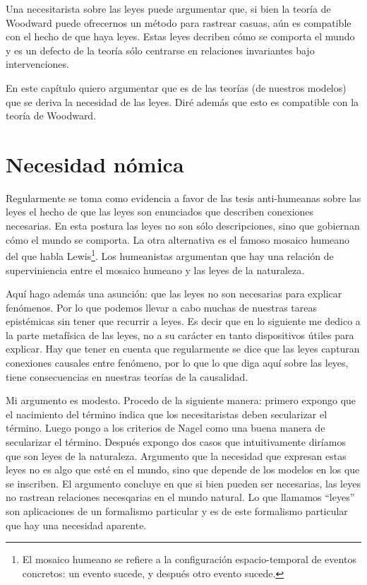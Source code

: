 Una necesitarista sobre las leyes puede argumentar que, si bien la teoría de Woodward puede ofrecernos un método para rastrear casuas, aún es compatible con el hecho de que haya leyes. Estas leyes decriben cómo se comporta el mundo y es un defecto de la teoría sólo centrarse en relaciones invariantes bajo intervenciones.

En este capítulo quiero argumentar que es de las teorías (de nuestros modelos) que se deriva la necesidad de las leyes. Diré además que esto es compatible con la teoría de Woodward.


\section{Necesidad nómica}

\noindent Regularmente se toma como evidencia a favor de las tesis anti-humeanas sobre las leyes el hecho de que las leyes son enunciados que describen conexiones necesarias. En esta postura las leyes no son sólo descripciones, sino que gobiernan cómo el mundo se comporta\cite{Bhogal2020}. La otra alternativa es el famoso mosaico humeano del que habla Lewis\footnote{El mosaico humeano se refiere a la configuración espacio-temporal de eventos concretos: un evento sucede, y después otro evento sucede.}. Los humeanistas argumentan que hay una relación de superviniencia entre el mosaico humeano y las leyes de la naturaleza.

Aquí hago además una asunción: que las leyes no son necesarias para explicar fenómenos. Por lo que podemos llevar a cabo muchas de nuestras tareas epistémicas sin tener que recurrir a leyes. Es decir que en lo siguiente me dedico a la parte metafísica de las leyes, no a su carácter en tanto dispositivos útiles para explicar. Hay que tener en cuenta que regularmente se dice que las leyes capturan conexiones causales entre fenómeno, por lo que lo que diga aquí sobre las leyes, tiene consecuencias en nuestras teorías de la causalidad.

Mi argumento es modesto. Procedo de la siguiente manera: primero expongo que el nacimiento del término indica que los necesitaristas deben secularizar el término. Luego pongo a los criterios de Nagel como una buena manera de secularizar el término. Después expongo dos casos que intuitivamente diríamos que son leyes de la naturaleza. Argumento que la necesidad que expresan estas leyes no es algo que esté en el mundo, sino que depende de los modelos en los que se inscriben. El argumento concluye en que si bien pueden ser necesarias, las leyes no rastrean relaciones necesqarias en el mundo natural. Lo que llamamos ``leyes'' son aplicaciones de un formalismo particular y es de este formalismo particular que hay una necesidad aparente.

